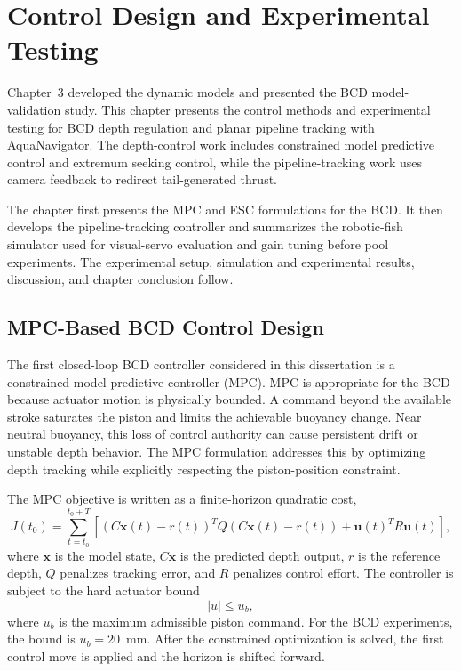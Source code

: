 \documentclass{uhcoethesis}
\begin{document}
\chapter{Control Design and Experimental Testing}

Chapter~3 developed the dynamic models and presented the BCD model-validation study. This chapter presents the control methods and experimental testing for BCD depth regulation and planar pipeline tracking with AquaNavigator. The depth-control work includes constrained model predictive control and extremum seeking control, while the pipeline-tracking work uses camera feedback to redirect tail-generated thrust.

The chapter first presents the MPC and ESC formulations for the BCD. It then develops the pipeline-tracking controller and summarizes the robotic-fish simulator used for visual-servo evaluation and gain tuning before pool experiments. The experimental setup, simulation and experimental results, discussion, and chapter conclusion follow.

\section{MPC-Based BCD Control Design}

The first closed-loop BCD controller considered in this dissertation is a constrained model predictive controller (MPC). MPC is appropriate for the BCD because actuator motion is physically bounded. A command beyond the available stroke saturates the piston and limits the achievable buoyancy change. Near neutral buoyancy, this loss of control authority can cause persistent drift or unstable depth behavior. The MPC formulation addresses this by optimizing depth tracking while explicitly respecting the piston-position constraint.

The MPC objective is written as a finite-horizon quadratic cost,
\begin{equation}
    J(t_0) =
    \sum_{t=t_0}^{t_0+T}
    \left[
        \left(C\mathbf{x}(t)-r(t)\right)^T
        Q
        \left(C\mathbf{x}(t)-r(t)\right)
        +
        \mathbf{u}(t)^T R \mathbf{u}(t)
    \right],
    \label{eq:ch3_mpc_cost}
\end{equation}
where $\mathbf{x}$ is the model state, $C\mathbf{x}$ is the predicted depth output, $r$ is the reference depth, $Q$ penalizes tracking error, and $R$ penalizes control effort. The controller is subject to the hard actuator bound
\begin{equation}
    |u| \leq u_b ,
    \label{eq:ch3_mpc_constraint}
\end{equation}
where $u_b$ is the maximum admissible piston command. For the BCD experiments, the bound is $u_b=20$~mm. After the constrained optimization is solved, the first control move is applied and the horizon is shifted forward.
\end{document}
